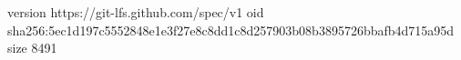version https://git-lfs.github.com/spec/v1
oid sha256:5ec1d197c5552848e1e3f27e8c8dd1c8d257903b08b3895726bbafb4d715a95d
size 8491

